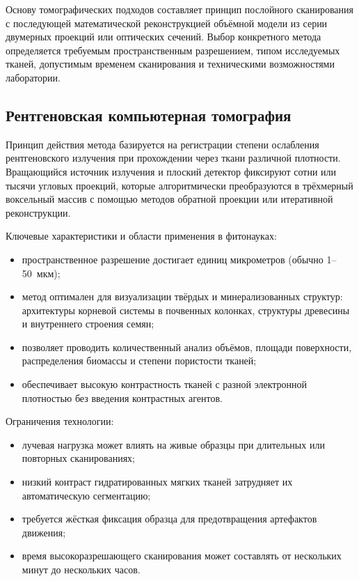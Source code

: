 \documentclass[14pt,a4paper]{extreport}
\begin{document}
Основу томографических подходов составляет принцип послойного сканирования с последующей математической реконструкцией объёмной модели из серии двумерных проекций или оптических сечений. Выбор конкретного метода определяется требуемым пространственным разрешением, типом исследуемых тканей, допустимым временем сканирования и техническими возможностями лаборатории.

\subsection{Рентгеновская компьютерная томография}

Принцип действия метода базируется на регистрации степени ослабления рентгеновского излучения при прохождении через ткани различной плотности. Вращающийся источник излучения и плоский детектор фиксируют сотни или тысячи угловых проекций, которые алгоритмически преобразуются в трёхмерный воксельный массив с помощью методов обратной проекции или итеративной реконструкции.

Ключевые характеристики и области применения в фитонауках:
\begin{itemize}
  \item пространственное разрешение достигает единиц микрометров (обычно 1--50~мкм);
  \item метод оптимален для визуализации твёрдых и минерализованных структур: архитектуры корневой системы в почвенных колонках, структуры древесины и внутреннего строения семян;
  \item позволяет проводить количественный анализ объёмов, площади поверхности, распределения биомассы и степени пористости тканей;
  \item обеспечивает высокую контрастность тканей с разной электронной плотностью без введения контрастных агентов.
\end{itemize}

Ограничения технологии:
\begin{itemize}
  \item лучевая нагрузка может влиять на живые образцы при длительных или повторных сканированиях;
  \item низкий контраст гидратированных мягких тканей затрудняет их автоматическую сегментацию;
  \item требуется жёсткая фиксация образца для предотвращения артефактов движения;
  \item время высокоразрешающего сканирования может составлять от нескольких минут до нескольких часов.
\end{itemize}
\end{document}
